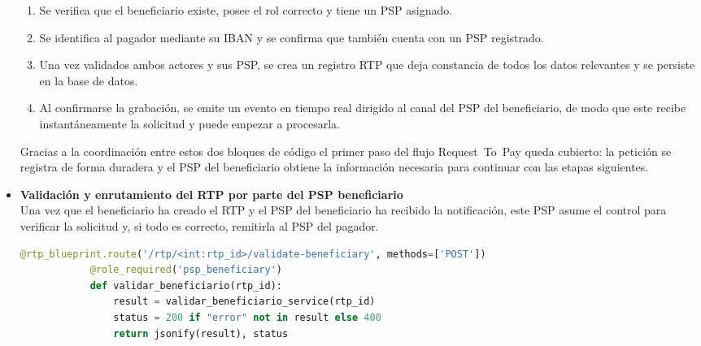 \begin{itemize}
        \begin{enumerate}
          \item Se verifica que el beneficiario existe, posee el rol correcto
                y tiene un PSP asignado.  
          \item Se identifica al pagador mediante su IBAN y se confirma que
                también cuenta con un PSP registrado.  
          \item Una vez validados ambos actores y sus PSP, se crea un registro
                RTP que deja constancia de todos los datos relevantes y se
                persiste en la base de datos.  
          \item Al confirmarse la grabación, se emite un evento en tiempo real
                dirigido al canal del PSP del beneficiario, de modo que este
                recibe instantáneamente la solicitud y puede empezar a
                procesarla.
        \end{enumerate}
        \bigskip

        Gracias a la coordinación entre estos dos bloques de código el primer
        paso del flujo Request~To~Pay queda cubierto: la petición se registra
        de forma duradera y el PSP del beneficiario obtiene la información
        necesaria para continuar con las etapas siguientes.

    \item \textbf{Validación y enrutamiento del RTP por parte del PSP beneficiario}\\[6pt]
        Una vez que el beneficiario ha creado el RTP y el PSP del beneficiario ha
        recibido la notificación, este PSP asume el control para verificar la
        solicitud y, si todo es correcto, remitirla al PSP del pagador.
        \vspace{0.6em}

       \begin{lstlisting}[language=Python, style=custom, caption={Endpoints para validación y enrutado}]
            @rtp_blueprint.route('/rtp/<int:rtp_id>/validate-beneficiary', methods=['POST'])
            @role_required('psp_beneficiary')
            def validar_beneficiario(rtp_id):
                result = validar_beneficiario_service(rtp_id)
                status = 200 if "error" not in result else 400
                return jsonify(result), status


\end{lstlisting}
\end{itemize}
